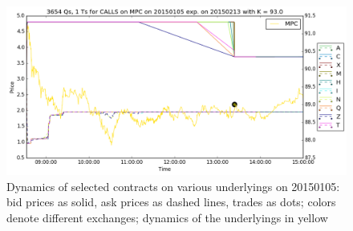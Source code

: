 \documentclass[a4paper,12pt]{article}
\theoremstyle{plain}
\theoremstyle{definition}
\begin{document}
\begin{figure}[H]
\begin{center}
 \endminipage
 \hspace{3mm}
 \includegraphics[width=\linewidth]{figures/contract_pics/MPC_middle.png}
 \endminipage
\end{center}
\vspace{-3mm}
\caption{\footnotesize Dynamics of selected contracts on various underlyings on 20150105: bid prices as solid, ask prices as dashed lines, trades as dots; colors denote different exchanges; dynamics of the underlyings in yellow} 
\label{cntrt_pics_2}
\end{figure}
\vspace*{\fill}

\newpage
\end{document}
